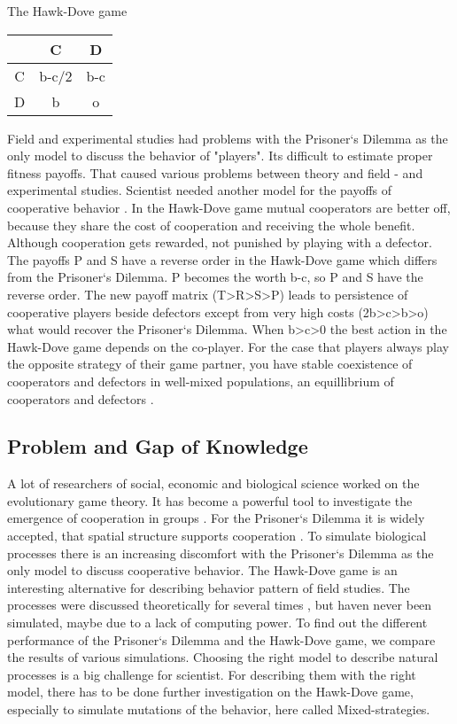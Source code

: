 The Hawk-Dove game

\begin{tabular}{|c|c|c|}
	\hline  & C & D \\ 
	\hline C & b-c/2 & b-c \\ 
	\hline D & b & o \\ 
	\hline 
\end{tabular} 
 
Field and experimental studies had problems with the Prisoner`s Dilemma as the only model to discuss the behavior of "players". Its difficult to estimate proper fitness payoffs. That caused various problems between theory and field -  and experimental studies. Scientist needed another model for the payoffs of cooperative behavior \citep{milinski1997, nowak1992}. In the Hawk-Dove game mutual cooperators are better off, because they share the cost of cooperation and receiving the whole benefit. Although cooperation gets rewarded, not punished by playing with a defector. The payoffs P and S have a reverse order in the Hawk-Dove game which differs from the Prisoner`s Dilemma. P becomes the worth b-c, so P and S have the reverse order. The new payoff matrix (T>R>S>P) leads to persistence of cooperative players beside defectors except from very high costs (2b>c>b>o) what would recover the Prisoner`s Dilemma. When b>c>0 the best action in the Hawk-Dove game depends on the co-player. For the case that players always play the opposite strategy of their game partner, you have stable coexistence of cooperators and defectors in well-mixed populations, an equillibrium of cooperators and defectors \citep{HauertandDoebeli2004}.

\subsection{Problem and Gap of Knowledge}
A lot of researchers of social, economic and biological science worked on the evolutionary game theory. It has become a powerful tool to investigate the emergence of cooperation in groups \citep{HauertandDoebeli2004}. For the Prisoner`s Dilemma it is widely accepted, that spatial structure supports cooperation \citep{margules2000}. To simulate biological processes there is an increasing discomfort with the Prisoner`s Dilemma as the only model to discuss cooperative behavior. The Hawk-Dove game is an interesting alternative for describing behavior pattern of field studies\citep{milinski1987}. The processes were discussed theoretically for several times \citep{nowak1992, milinski1987}, but haven never been simulated, maybe due to a lack of computing power.  To find out the different performance of  the Prisoner`s Dilemma and  the  Hawk-Dove game, we compare the results of various simulations. Choosing the right model to describe natural processes is a big challenge for scientist. For describing them with the right model, there has to be done further investigation on the Hawk-Dove game, especially to simulate mutations of the behavior, here called Mixed-strategies. 

